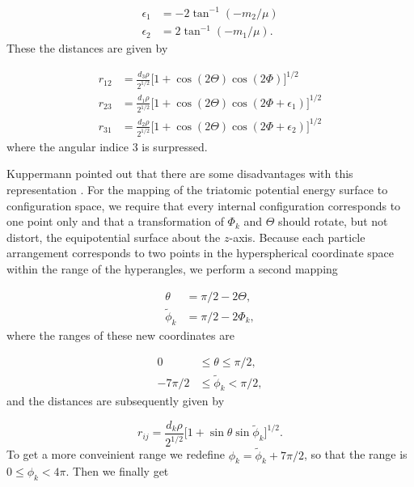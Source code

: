 \begin{equation}
\begin{aligned}
\epsilon_1 &= -2\tan^{-1}(-m_2/\mu)\\
\epsilon_2 &= 2\tan^{-1}(-m_1/\mu).
\end{aligned}
\end{equation} 
These the distances are given by 

\begin{equation}
\begin{aligned}
r_{12} &= \frac{d_3\rho}{2^{1/2}}\big[1+\cos(2\Theta)\cos(2\Phi)\big]^{1/2}\\
r_{23} &= \frac{d_1\rho}{2^{1/2}}\big[1 + \cos(2\Theta)\cos(2\Phi + \epsilon_1)\big]^{1/2}\\
r_{31} &= \frac{d_2\rho}{2^{1/2}}\big[1 + \cos(2\Theta)\cos(2\Phi + \epsilon_2)\big]^{1/2}
\end{aligned}
\end{equation}
where the angular indice $3$ is surpressed.

Kuppermann pointed out that there are some disadvantages with this representation \cite{KUPPERMANN1975374}. For the mapping of the triatomic potential energy surface to configuration space, we require that every internal configuration corresponds to one point only and that a transformation of $\Phi_k$ and $\Theta$ should rotate, but not distort, the equipotential surface about the $z$-axis. Because each particle arrangement corresponds to two points in the hyperspherical coordinate space within the range of the hyperangles, we perform a second mapping

\begin{equation}
\begin{aligned}
\theta &= \pi/2-2\Theta,\\
\tilde{\phi}_k &= \pi/2-2\Phi_k,
\end{aligned}
\end{equation}
where the ranges of these new coordinates are 

\begin{equation}
\begin{aligned}
0  &\leq \theta \leq \pi/2,\\
-7\pi/2 &\leq \tilde{\phi}_k < \pi/2,
\end{aligned}
\end{equation} 
and the distances are subsequently given by

\begin{equation}
r_{ij} = \frac{d_k\rho}{2^{1/2}}\big[1 + \sin\theta\sin\tilde{\phi}_k\big]^{1/2}.
\end{equation}
To get a more conveinient range we redefine $\phi_k = \tilde{\phi}_k+7\pi/2$, so that the range is $0 \leq \phi_k < 4\pi$. Then we finally get

